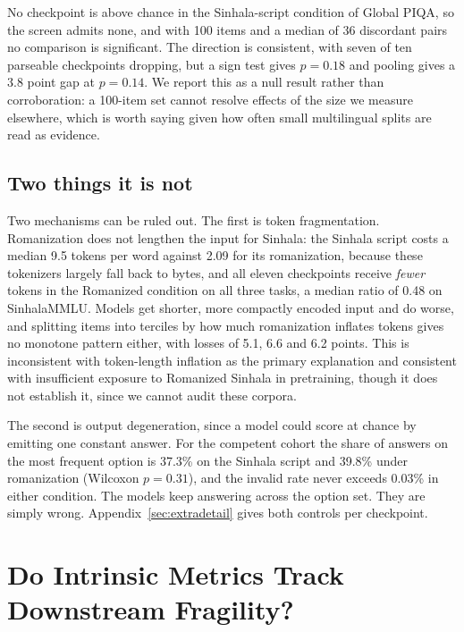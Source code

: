 \documentclass[11pt]{article}
\begin{document}
No checkpoint is above chance in the Sinhala-script condition of Global PIQA, so the
screen admits none, and with 100 items and a median of 36 discordant pairs no
comparison is significant. The direction is consistent, with seven of ten parseable
checkpoints dropping, but a sign test gives $p = 0.18$ and pooling gives a 3.8 point
gap at $p = 0.14$. We report this as a null result rather than corroboration: a
100-item set cannot resolve effects of the size we measure elsewhere, which is worth
saying given how often small multilingual splits are read as evidence.

\subsection{Two things it is not}
\label{sec:controls}

Two mechanisms can be ruled out. The first is token fragmentation. Romanization does
not lengthen the input for Sinhala: the Sinhala script costs a median 9.5 tokens per
word against 2.09 for its romanization, because these tokenizers largely fall back to
bytes, and all eleven checkpoints receive \emph{fewer} tokens in the Romanized
condition on all three tasks, a median ratio of 0.48 on SinhalaMMLU. Models get
shorter, more compactly encoded input and do worse, and splitting items into terciles
by how much romanization inflates tokens gives no monotone pattern either, with losses
of 5.1, 6.6 and 6.2 points. This is inconsistent with token-length inflation as the
primary explanation and consistent with insufficient exposure to Romanized Sinhala in
pretraining, though it does not establish it, since we cannot audit these corpora.

The second is output degeneration, since a model could score at chance by emitting one
constant answer. For the competent cohort the share of answers on the most frequent
option is 37.3\% on the Sinhala script and 39.8\% under romanization (Wilcoxon
$p = 0.31$), and the invalid rate never exceeds 0.03\% in either condition. The models
keep answering across the option set. They are simply wrong.
Appendix~\ref{sec:extradetail} gives both controls per checkpoint.

\section{Do Intrinsic Metrics Track Downstream Fragility?}
\label{sec:linkage}
\end{document}
